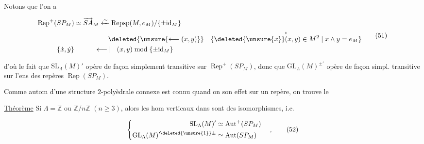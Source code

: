 
Notons que l'on a

\[
\begin{aligned}
\operatorname{Rep}^{+}(SP_M)&\simeq\overrightarrow{SA}_M\xleftarrow{\sim}\operatorname{Repsp}(M,e_M)/\{\pm\mathrm{id}_M\}\\
&\hspace{5em}\deleted{\unsure{\longleftarrow(x,y)}}\quad
\overset{\shortparallel}{\{\deleted{\unsure{x}}(x,y)\in M^2\mid x\wedge y=e_M\}}\\
\{\dot{x},\dot{y}\}&\hspace{3em}\longleftarrow\!\vert\quad (x,y)\bmod\{\pm\mathrm{id}_M\}
\end{aligned}\tag*{(51)}
\]

d'où le fait que $\mathrm{SL}_\Lambda(M)'$ opère de façon simplement transitive sur $\operatorname{Rep}^{+}(SP_M)$, donc que $\mathrm{GL}_\Lambda(M)^{\pm\prime}$ opère de façon simpl. transitive sur l'ens des repères $\operatorname{Rep}(SP_M)$.




Comme  autom d'une structure $2$-polyèdrale  connexe est connu quand on  son effet sur un repère, on trouve le

\noindent\vrule\hspace{.5em}\parbox{.92\linewidth}{\uline{Théorème} Si $\Lambda=\mathbb{Z}$ ou $\mathbb{Z}/n\mathbb{Z}$ $(n\geq3)$, alors les hom verticaux dans  sont des isomorphismes, i.e.}

\[
\left\{\begin{aligned}
\mathrm{SL}_\Lambda(M)'&\simeq\operatorname{Aut}^{+}(SP_M)\\
\mathrm{GL}_\Lambda(M)^{\prime\deleted{\unsure{1}}\pm}&\simeq\operatorname{Aut}(SP_M)
\end{aligned}\right.\quad,\tag*{(52)}
\]

